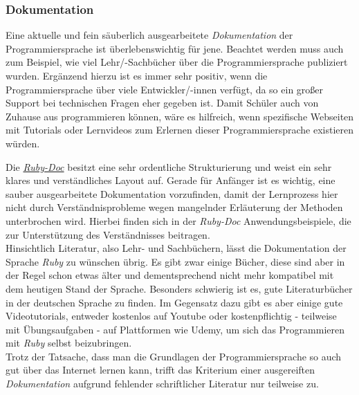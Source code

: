 \documentclass[12pt,DIV=14, version=first, BCOR=10mm,a4paper,twoside,parskip=half-,headsepline,headinclude]{scrartcl}
\begin{document}
\subsubsection{Dokumentation}
\begin{flushleft}
Eine aktuelle und fein säuberlich ausgearbeitete \textit{Dokumentation} der Programmiersprache ist überlebenswichtig für jene. Beachtet werden muss auch zum Beispiel, wie viel Lehr/-Sachbücher über die Programmiersprache publiziert wurden. Ergänzend hierzu ist es immer sehr positiv, wenn die Programmiersprache über viele Entwickler/-innen verfügt, da so ein großer Support bei technischen Fragen eher gegeben ist. Damit Schüler auch von Zuhause aus programmieren können, wäre es hilfreich, wenn spezifische Webseiten mit Tutorials oder Lernvideos zum Erlernen dieser Programmiersprache existieren würden.

Die \href {https://ruby-doc.org/}{\textit{\glqq Ruby-Doc\grqq}} besitzt eine sehr ordentliche Strukturierung und weist ein sehr klares und verständliches Layout auf. Gerade für Anfänger ist es wichtig, eine sauber ausgearbeitete Dokumentation vorzufinden, damit der Lernprozess hier nicht durch Verständnisprobleme wegen mangelnder Erläuterung der Methoden unterbrochen wird. Hierbei finden sich in der \textit{\glqq Ruby-Doc\grqq} Anwendungsbeispiele, die zur Unterstützung des Verständnisses beitragen. \\
Hinsichtlich Literatur, also Lehr- und Sachbüchern, lässt die Dokumentation der Sprache \textit{\glqq Ruby\grqq} zu wünschen übrig. Es gibt zwar einige Bücher, diese sind aber in der Regel schon etwas älter und dementsprechend nicht mehr kompatibel mit dem heutigen Stand der Sprache. Besonders schwierig ist es, gute Literaturbücher in der deutschen Sprache zu finden. Im Gegensatz dazu gibt es aber einige gute Videotutorials, entweder kostenlos auf {\glqq Youtube\grqq} oder kostenpflichtig - teilweise mit Übungsaufgaben - auf Plattformen wie {\glqq Udemy\grqq}, um sich das Programmieren mit \textit{\glqq Ruby\grqq} selbst beizubringen.\\
Trotz der Tatsache, dass man die Grundlagen der Programmiersprache so auch gut über das Internet lernen kann, trifft das Kriterium einer ausgereiften \textit{Dokumentation} aufgrund fehlender schriftlicher Literatur nur teilweise zu.
\end{flushleft}
\end{document}
